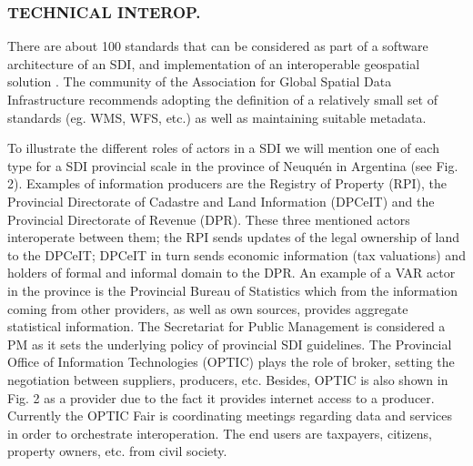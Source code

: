 \documentclass[10pt,twocolumn,ieeetran]{article}
\begin{document}
\subsubsection{TECHNICAL INTEROP.}

There are about 100 standards that can be considered as part of a software architecture of an SDI, and implementation of an interoperable geospatial solution \cite{Masser}.
The community of the Association for Global Spatial Data Infrastructure recommends adopting the definition of a relatively small set of standards (eg. WMS, WFS, etc.) as well as maintaining suitable metadata.

To illustrate the different roles of actors in a SDI we will mention one of each type for a SDI provincial scale in the province of Neuqu\' en in Argentina (see Fig. 2). Examples of information producers are the Registry of Property (RPI), the Provincial Directorate of Cadastre and Land Information (DPCeIT) and the Provincial Directorate of Revenue (DPR).
These three  mentioned actors  interoperate between them; the RPI sends updates of the legal ownership of land to the  DPCeIT; DPCeIT in turn sends economic information (tax valuations) and holders of formal and informal domain to the DPR. An example of a VAR actor in the province is the Provincial Bureau of Statistics which from the information coming from other providers, as well as own sources, provides  aggregate statistical information.
The Secretariat for Public Management is considered a PM as it sets  the underlying policy of provincial SDI guidelines. The Provincial Office of Information Technologies (OPTIC) plays the role of broker, setting the negotiation between suppliers, producers, etc. Besides, OPTIC is also shown in Fig. 2 as a provider due to the fact it provides internet access to a producer. Currently the OPTIC Fair is coordinating meetings regarding  data and services in order to orchestrate interoperation. The end users are taxpayers, citizens, property owners, etc.  from civil society.
\end{document}

